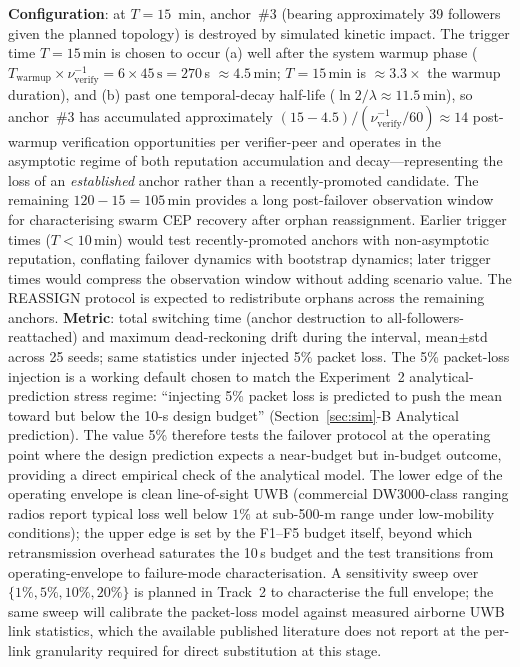 \documentclass[conference,10pt]{IEEEtran}
\begin{document}
\textbf{Configuration}: at $T{=}15$~min, anchor~\#3 (bearing approximately 39 followers given the planned topology) is destroyed by simulated kinetic impact. The trigger time $T=15$\,min is chosen to occur (a) well after the system warmup phase ($T_\text{warmup} \times \nu_\text{verify}^{-1} = 6 \times 45\,\text{s} = 270$\,s $\approx 4.5$\,min; $T=15$\,min is $\approx 3.3\times$ the warmup duration), and (b) past one temporal-decay half-life ($\ln 2/\lambda \approx 11.5$\,min), so anchor~\#3 has accumulated approximately $(15-4.5)/(\nu_\text{verify}^{-1}/60) \approx 14$ post-warmup verification opportunities per verifier-peer and operates in the asymptotic regime of both reputation accumulation and decay---representing the loss of an \emph{established} anchor rather than a recently-promoted candidate. The remaining $120-15=105$\,min provides a long post-failover observation window for characterising swarm CEP recovery after orphan reassignment. Earlier trigger times ($T<10$\,min) would test recently-promoted anchors with non-asymptotic reputation, conflating failover dynamics with bootstrap dynamics; later trigger times would compress the observation window without adding scenario value. The REASSIGN protocol is expected to redistribute orphans across the remaining anchors.
\textbf{Metric}: total switching time (anchor destruction to all-followers-reattached) and maximum dead-reckoning drift during the interval, mean$\pm$std across 25 seeds; same statistics under injected 5\% packet loss. The 5\% packet-loss injection is a working default chosen to match the Experiment~2 analytical-prediction stress regime: ``injecting 5\% packet loss is predicted to push the mean toward but below the 10-s design budget'' (Section~\ref{sec:sim}-B Analytical prediction). The value 5\% therefore tests the failover protocol at the operating point where the design prediction expects a near-budget but in-budget outcome, providing a direct empirical check of the analytical model. The lower edge of the operating envelope is clean line-of-sight UWB (commercial DW3000-class ranging radios report typical loss well below $1\%$ at sub-500-m range under low-mobility conditions); the upper edge is set by the F1--F5 budget itself, beyond which retransmission overhead saturates the 10\,s budget and the test transitions from operating-envelope to failure-mode characterisation. A sensitivity sweep over $\{1\%, 5\%, 10\%, 20\%\}$ is planned in Track~2 to characterise the full envelope; the same sweep will calibrate the packet-loss model against measured airborne UWB link statistics, which the available published literature does not report at the per-link granularity required for direct substitution at this stage.
\end{document}
